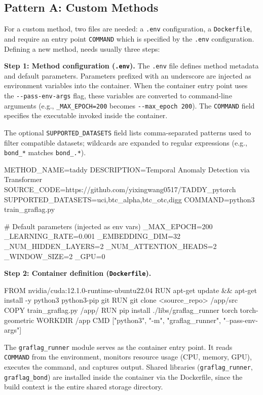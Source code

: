 \documentclass[twoside,11pt]{article}
\begin{document}
\subsection{Pattern A: Custom Methods}

For a custom method, two files are needed: a \texttt{.env} configuration, a \texttt{Dockerfile}, and require an entry point \texttt{COMMAND} which is specified by the \texttt{.env} configuration. Defining a new method, needs usually three steps:

\textbf{Step 1: Method configuration (\texttt{.env}).} The \texttt{.env} file defines method metadata and default parameters. Parameters prefixed with an underscore are injected as environment variables into the container. When the container entry point uses the \texttt{-{}-pass-env-args} flag, these variables are converted to command-line arguments (e.g., \texttt{\_MAX\_EPOCH=200} becomes \texttt{-{}-max\_epoch~200}). The \texttt{COMMAND} field specifies the executable invoked inside the container.

The optional \texttt{SUPPORTED\_DATASETS} field lists comma-separated patterns used to filter compatible datasets; wildcards are expanded to regular expressions (e.g., \texttt{bond\_*} matches \texttt{bond\_.*}).

\begin{codebox}
METHOD_NAME=taddy
DESCRIPTION=Temporal Anomaly Detection via Transformer
SOURCE_CODE=https://github.com/yixingwang0517/TADDY_pytorch
SUPPORTED_DATASETS=uci,btc_alpha,btc_otc,digg
COMMAND=python3 train_graflag.py

# Default parameters (injected as env vars)
_MAX_EPOCH=200
_LEARNING_RATE=0.001
_EMBEDDING_DIM=32
_NUM_HIDDEN_LAYERS=2
_NUM_ATTENTION_HEADS=2
_WINDOW_SIZE=2
_GPU=0
\end{codebox}

\textbf{Step 2: Container definition (\texttt{Dockerfile}).}

\begin{codebox}
FROM nvidia/cuda:12.1.0-runtime-ubuntu22.04
RUN apt-get update && apt-get install -y python3 python3-pip git
RUN git clone <source_repo> /app/src
COPY train_graflag.py /app/
RUN pip install ./libs/graflag_runner torch torch-geometric
WORKDIR /app
CMD ["python3", "-m", "graflag_runner", "--pass-env-args"]
\end{codebox}

The \texttt{graflag\_runner} module serves as the container entry point. It reads \texttt{COMMAND} from the environment, monitors resource usage (CPU, memory, GPU), executes the command, and captures output. Shared libraries (\texttt{graflag\_runner}, \texttt{graflag\_bond}) are installed inside the container via the Dockerfile, since the build context is the entire shared storage directory.
\end{document}
